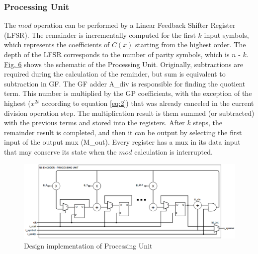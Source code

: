 \documentclass[conference]{IEEEtran}
\begin{document}
\subsubsection{Processing Unit}
The $mod$ operation can be performed by a Linear Feedback Shifter Register (LFSR). The remainder is incrementally computed for the first $k$ input symbols, which represents the coefficients of $C(x)$ starting from the highest order. The depth of the LFSR corresponds to the number of parity symbols, which is $n$ - $k$. \hyperref[fig:fig6]{Fig. 6} shows the schematic of the Processing Unit. Originally, subtractions are required during the calculation of the reminder, but sum is equivalent to subtraction in GF. The GF adder A\_div is responsible for finding the quotient term. This number is multiplied by the GP coefficients, with the exception of the highest ($x^{2t}$ according to equation \ref{eq:2}) that was already canceled in the current division operation step. The multiplication result is them summed (or subtracted) with the previous terms and stored into the registers. After $k$ steps, the remainder result is completed, and then it can be output by selecting the first input of the output mux (M\_out). Every register has a mux in its data input that may conserve its state when the $mod$ calculation is interrupted.  


\begin{figure}[!hbt]
  \includegraphics[width=\linewidth]{figures/fig12_a.png}
  \caption{Design implementation of Processing Unit}
  \label{fig:fig6}
\end{figure}  
\end{document}
